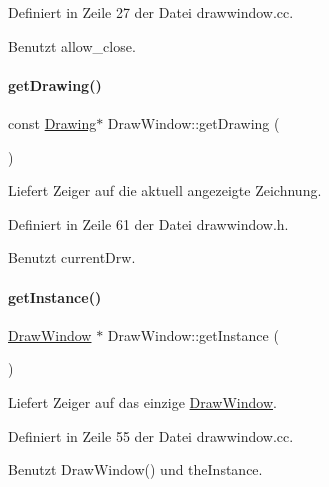 Definiert in Zeile 27 der Datei drawwindow.\+cc.



Benutzt allow\+\_\+close.

\mbox{\label{classDrawWindow_ab37002c26d9f063023c937f6abf00b1b}} 
\paragraph{\texorpdfstring{get\+Drawing()}{getDrawing()}}
{\footnotesize\ttfamily const \mbox{\hyperlink{classDrawing}{Drawing}}$\ast$ Draw\+Window\+::get\+Drawing (\begin{DoxyParamCaption}{ }\end{DoxyParamCaption})\hspace{0.3cm}{\ttfamily [inline]}}



Liefert Zeiger auf die aktuell angezeigte Zeichnung. 



Definiert in Zeile 61 der Datei drawwindow.\+h.



Benutzt current\+Drw.

\mbox{\label{classDrawWindow_ad6ccd97298af0331b99587071ba682de}} 
\paragraph{\texorpdfstring{get\+Instance()}{getInstance()}}
{\footnotesize\ttfamily \mbox{\hyperlink{classDrawWindow}{Draw\+Window}} $\ast$ Draw\+Window\+::get\+Instance (\begin{DoxyParamCaption}{ }\end{DoxyParamCaption})\hspace{0.3cm}{\ttfamily [static]}}



Liefert Zeiger auf das einzige \mbox{\hyperlink{classDrawWindow}{Draw\+Window}}. 



Definiert in Zeile 55 der Datei drawwindow.\+cc.



Benutzt Draw\+Window() und the\+Instance.




